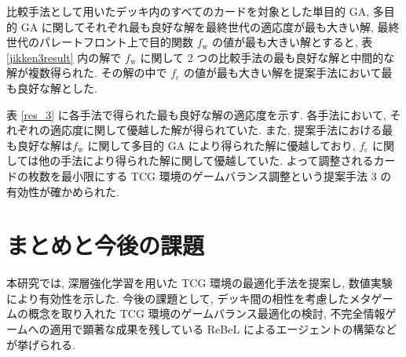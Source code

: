 \documentclass[twocolumn]{jarticle}     %
\begin{document}
   比較手法として用いたデッキ内のすべてのカードを対象とした単目的 GA, 多目的 GA に関してそれぞれ最も良好な解を最終世代の適応度が最も大きい解, 最終世代のパレートフロント上で目的関数 $f_\mathrm{w}$ の値が最も大きい解とすると, 表 \ref{jikken3result} 内の解で $f_\mathrm{w}$ に関して 2 つの比較手法の最も良好な解と中間的な解が複数得られた. その解の中で $f_\mathrm{c}$ の値が最も大きい解を提案手法において最も良好な解とした.\par
   表 \ref{res_3} に各手法で得られた最も良好な解の適応度を示す.
各手法において, それぞれの適応度に関して優越した解が得られていた. また, 提案手法における最も良好な解は$f_\mathrm{w}$ に関して多目的 GA により得られた解に優越しており, $f_\mathrm{c}$ に関しては他の手法により得られた解に関して優越していた. よって調整されるカードの枚数を最小限にする TCG 環境のゲームバランス調整という提案手法 3 の有効性が確かめられた. 

\section{まとめと今後の課題}
本研究では, 深層強化学習を用いた TCG 環境の最適化手法を提案し, 数値実験により有効性を示した. 今後の課題として, デッキ間の相性を考慮したメタゲームの概念を取り入れた TCG 環境のゲームバランス最適化の検討, 不完全情報ゲームへの適用で顕著な成果を残している ReBeL \cite{ReBeL} によるエージェントの構築などが挙げられる. 


\end{document}
